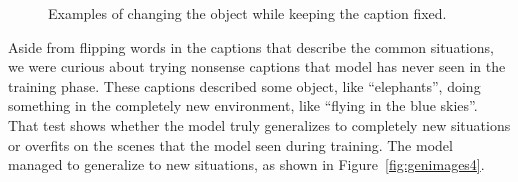\documentclass{article} %
\begin{document}
\begin{figure}[!h]
\captionsetup[subfigure]{labelformat=empty}
\begin{center}
\quad
%
\quad
%
\quad
%
\quad
%
\end{center}
\caption{Examples of changing the object while keeping the caption fixed.}
\label{fig:genimages3}
\vspace{-0.3cm}
\end{figure}

Aside from flipping words in the captions that describe the common situations, we were curious about trying nonsense captions that model has never seen in the training phase. These captions described some object, like ``elephants'', doing something in the completely new environment, like ``flying in the blue skies''. That test shows whether the model truly generalizes to completely new situations or overfits on the scenes that the model seen during training. The model managed to generalize to new situations, as shown in Figure~\ref{fig:genimages4}.
\end{document}

